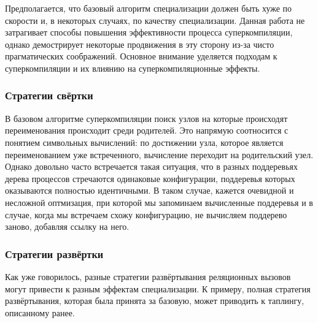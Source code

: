 Предполагается, что базовый алгоритм специализации должен быть хуже по
скорости и, в некоторых случаях, по качеству специализации.
Данная работа не затрагивает способы повышения эффективности процесса
суперкомпиляции, однако демострирует некоторые продвижения в эту сторону
из-за чисто прагматических соображений. Основное внимание уделяется
подходам к суперкомпиляции и их влиянию на суперкомпиляционные эффекты.

\subsubsection{Стратегии свёртки}

В базовом алгоритме суперкомпиляции поиск узлов на которые происходят переименования
происходит среди родителей. Это напрямую соотносится с понятием символьных
вычислений: по достижении узла, которое является переименованием уже встреченного,
вычисление переходит на родительский узел. Однако довольно часто встречается
такая ситуация,
что в разных поддеревьях дерева процессов стречаются одинаковые конфигурации,
поддеревья которых оказываются полностью идентичными. В таком случае, кажется
очевидной и несложной оптмизация, при которой мы запоминаем вычисленные
поддеревья и в случае, когда мы встречаем схожу конфигурацию, не вычисляем
поддерево заново, добавляя ссылку на него.



\subsubsection{Стратегии развёртки}

Как уже говорилось, разные стратегии развёртывания реляционных вызовов могут
привести к разным эффектам специализации. К примеру, полная стратегия развёртывания,
которая была принята за базовую, может приводить к таплингу, описанному ранее.

